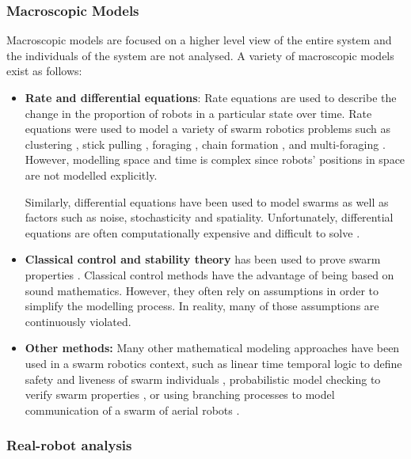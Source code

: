 \subsubsection{Macroscopic Models}
\label{macroscopicmodels}

Macroscopic models are focused on a higher level view of the entire system and the individuals of the system are not analysed. A variety of macroscopic models exist as follows: 
\begin{itemize}
	\item \textbf{Rate and differential equations}: Rate equations are used to describe the change in the proportion of robots in a particular state over time. Rate equations were used to model a variety of swarm robotics problems such as  clustering \cite{martinoli1999understanding}, stick pulling \cite{lerman2001macroscopic}, foraging \cite{lerman2002mathematical}, chain formation \cite{trianni2002modeling}, and multi-foraging \cite{campo2007efficient}. However, modelling space and time is complex since robots' positions in space are not modelled explicitly.

Similarly, differential equations have been used to model swarms as well as factors such as noise, stochasticity and spatiality. Unfortunately, differential equations are often computationally expensive and difficult to solve \cite{hamann2008framework, prorok2011multi}.

	\item \textbf{Classical control and stability theory} has been used to prove swarm properties \cite{gazi2005stability,liu2004stable, schwager2011time}.  Classical control methods have the advantage of being based on sound mathematics. However, they often rely on assumptions in order to simplify the modelling process. In reality, many of those assumptions are continuously violated.
	
	\item \textbf{Other methods:}
	Many other mathematical modeling approaches have been used in a swarm robotics context, such as linear time temporal logic to define safety and liveness of swarm individuals \cite{winfield2005formal}, probabilistic model checking to verify swarm properties \cite{konur2012analysing}, or using branching processes to model communication of a swarm of aerial robots \cite{mathews2010establishing}. 
\end{itemize}

\subsubsection{Real-robot analysis}

